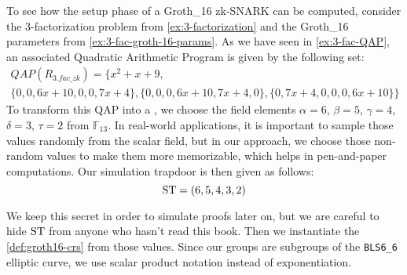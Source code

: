 \begin{example}
\label{ex:3-fac-groth-16-crs}
To see how the setup phase of a Groth\_16 zk-SNARK can be computed, consider the $3$-factorization problem from \ref{ex:3-factorization} and the Groth\_16 parameters from \examplename{} \ref{ex:3-fac-groth-16-params}. As we have seen in \ref{ex:3-fac-QAP}, an associated Quadratic Arithmetic Program is given by the following set:
\begin{multline*}
QAP(R_{3.fac\_zk}) =\{x^{2}+x+9,\\
 \{0,0,6x+10,0,0,7x+4\},\{0,0,0,6x+10,7x+4,0\},\{0,7x+4,0,0,0,6x+10\}\}
\end{multline*}
To transform this QAP into a , we choose the  field elements $\alpha=6$, $\beta=5$, $\gamma=4$, $\delta=3$, $\tau=2$ from $\mathbb{F}_{13}$. 
In real-world applications, it is important to sample those values randomly from the scalar field, but in our approach, we choose those non-random values to make them more memorizable, which helps in pen-and-paper computations. Our simulation trapdoor is then given as follows:
$$
\mathrm{ST} = (6,5,4,3,2)
$$

We keep this secret in order to simulate proofs later on, but we are careful to hide $\mathrm{ST}$ from anyone who hasn't read this book. Then we instantiate the  \ref{def:groth16-crs} from those values. Since our groups are subgroups of the \texttt{BLS6\_6} elliptic curve, we use scalar product notation instead of exponentiation. 


\end{example}

